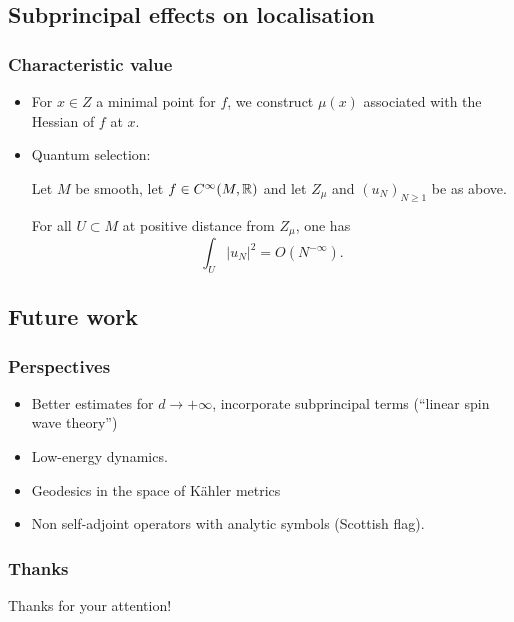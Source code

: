 \documentclass[mathserif]{beamer}
\newcommand{\mycite}[1]{{\color{mygreen} \small #1}}
\begin{document}
\subsection{Subprincipal effects on localisation}

\begin{frame}
  \frametitle{Characteristic value}
  \begin{itemize}
  \item For $x\in Z$ a minimal point for $f$, we construct $\mu(x)$
    associated with the Hessian of $f$ at $x$.
  \item<2-> {\color{myorange} Quantum selection}: 
  \begin{theorem}[\mycite{[\underline{D. 2020?}]}]
    Let $M$ be smooth, let $f\in C^{\infty}(M,\mathbb{R})$ and let $Z_{\mu}$ and
    $(u_N)_{N\geq 1}$ be as above.

    For all $U\subset M$ at positive distance from $Z_{\mu}$, one has
    \[
      \int_U
      |u_N|^2=O(N^{-\infty}).
      \]
    \end{theorem}
  \end{itemize}
\end{frame}

 \subsection{Future work}
\begin{frame}
  \frametitle{Perspectives}
    \begin{itemize}
    \item Better estimates for $d \to +\infty$, incorporate
      subprincipal terms (``linear spin wave theory'')
    \item Low-energy dynamics.
    \item Geodesics in the space of Kähler metrics
    \item Non self-adjoint operators with analytic symbols (Scottish flag).
    \end{itemize}
  \end{frame}

  \begin{frame}
    \frametitle{Thanks}
    \centering 
    {\Large Thanks for your attention!}
  \end{frame}
\end{document}
